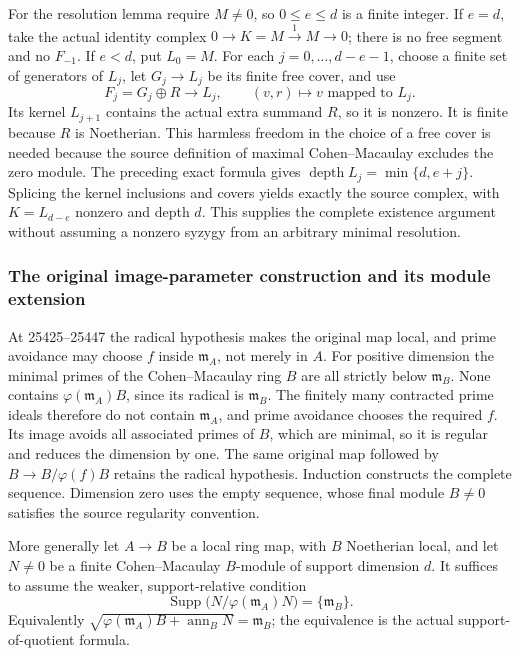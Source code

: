 For the resolution lemma require \(M\ne0\), so \(0\le e\le d\) is a finite integer. If \(e=d\), take the actual identity complex \(0\to K=M\xrightarrow{1}M\to0\); there is no free segment and no \(F_{-1}\). If \(e<d\), put \(L_0=M\). For each \(j=0,\ldots,d-e-1\), choose a finite set of generators of \(L_j\), let \(G_j\to L_j\) be its finite free cover, and use \[
 F_j=G_j\oplus R\longrightarrow L_j,\qquad (v,r)\longmapsto v\text{ mapped to }L_j.
\] Its kernel \(L_{j+1}\) contains the actual extra summand \(R\), so it is nonzero. It is finite because \(R\) is Noetherian. This harmless freedom in the choice of a free cover is needed because the source definition of maximal Cohen--Macaulay excludes the zero module. The preceding exact formula gives \(\operatorname{depth}L_j=\min\{d,e+j\}\). Splicing the kernel inclusions and covers yields exactly the source complex, with \(K=L_{d-e}\) nonzero and depth \(d\). This supplies the complete existence argument without assuming a nonzero syzygy from an arbitrary minimal resolution.

\subsubsection{The original image-parameter construction and its module extension}\label{algebra-proof-019-the-original-image-parameter-construction-and-its-module-extension}

At 25425--25447 the radical hypothesis makes the original map local, and prime avoidance may choose \(f\) inside \(\mathfrak m_A\), not merely in \(A\). For positive dimension the minimal primes of the Cohen--Macaulay ring \(B\) are all strictly below \(\mathfrak m_B\). None contains \(\varphi(\mathfrak m_A)B\), since its radical is \(\mathfrak m_B\). The finitely many contracted prime ideals therefore do not contain \(\mathfrak m_A\), and prime avoidance chooses the required \(f\). Its image avoids all associated primes of \(B\), which are minimal, so it is regular and reduces the dimension by one. The same original map followed by \(B\to B/\varphi(f)B\) retains the radical hypothesis. Induction constructs the complete sequence. Dimension zero uses the empty sequence, whose final module \(B\ne0\) satisfies the source regularity convention.

More generally let \(A\to B\) be a local ring map, with \(B\) Noetherian local, and let \(N\ne0\) be a finite Cohen--Macaulay \(B\)-module of support dimension \(d\). It suffices to assume the weaker, support-relative condition \[
 \operatorname{Supp}\bigl(N/\varphi(\mathfrak m_A)N\bigr)
       =\{\mathfrak m_B\}.
\] Equivalently \(\sqrt{\varphi(\mathfrak m_A)B+\operatorname{ann}_B N}=\mathfrak m_B\); the equivalence is the actual support-of-quotient formula.

